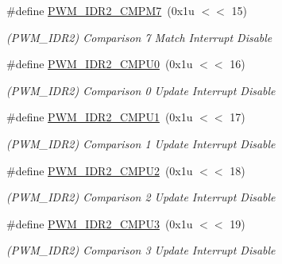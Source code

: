 \begin{DoxyCompactItemize}
\mbox{\label{group__SAMV71__PWM_gabc7b93057992ff6fc2052969a73a7654}} 
\#define \mbox{\hyperlink{group__SAMV71__PWM_gabc7b93057992ff6fc2052969a73a7654}{P\+W\+M\+\_\+\+I\+D\+R2\+\_\+\+C\+M\+P\+M7}}~(0x1u $<$$<$ 15)
\begin{DoxyCompactList}\small\item\em (P\+W\+M\+\_\+\+I\+D\+R2) Comparison 7 Match Interrupt Disable \end{DoxyCompactList}\item 
\mbox{\label{group__SAMV71__PWM_ga127c7d3f21eebb3c2404e5295c373567}} 
\#define \mbox{\hyperlink{group__SAMV71__PWM_ga127c7d3f21eebb3c2404e5295c373567}{P\+W\+M\+\_\+\+I\+D\+R2\+\_\+\+C\+M\+P\+U0}}~(0x1u $<$$<$ 16)
\begin{DoxyCompactList}\small\item\em (P\+W\+M\+\_\+\+I\+D\+R2) Comparison 0 Update Interrupt Disable \end{DoxyCompactList}\item 
\mbox{\label{group__SAMV71__PWM_ga5c5a299736bbcce28d62a005a967fd6d}} 
\#define \mbox{\hyperlink{group__SAMV71__PWM_ga5c5a299736bbcce28d62a005a967fd6d}{P\+W\+M\+\_\+\+I\+D\+R2\+\_\+\+C\+M\+P\+U1}}~(0x1u $<$$<$ 17)
\begin{DoxyCompactList}\small\item\em (P\+W\+M\+\_\+\+I\+D\+R2) Comparison 1 Update Interrupt Disable \end{DoxyCompactList}\item 
\mbox{\label{group__SAMV71__PWM_ga8c4148bf2bb9caba0bcab82cd29f5019}} 
\#define \mbox{\hyperlink{group__SAMV71__PWM_ga8c4148bf2bb9caba0bcab82cd29f5019}{P\+W\+M\+\_\+\+I\+D\+R2\+\_\+\+C\+M\+P\+U2}}~(0x1u $<$$<$ 18)
\begin{DoxyCompactList}\small\item\em (P\+W\+M\+\_\+\+I\+D\+R2) Comparison 2 Update Interrupt Disable \end{DoxyCompactList}\item 
\mbox{\label{group__SAMV71__PWM_ga07119f650f026cfc4c411d07c1944889}} 
\#define \mbox{\hyperlink{group__SAMV71__PWM_ga07119f650f026cfc4c411d07c1944889}{P\+W\+M\+\_\+\+I\+D\+R2\+\_\+\+C\+M\+P\+U3}}~(0x1u $<$$<$ 19)
\begin{DoxyCompactList}\small\item\em (P\+W\+M\+\_\+\+I\+D\+R2) Comparison 3 Update Interrupt Disable \end{DoxyCompactList}\item 
$$
\end{DoxyCompactItemize}
